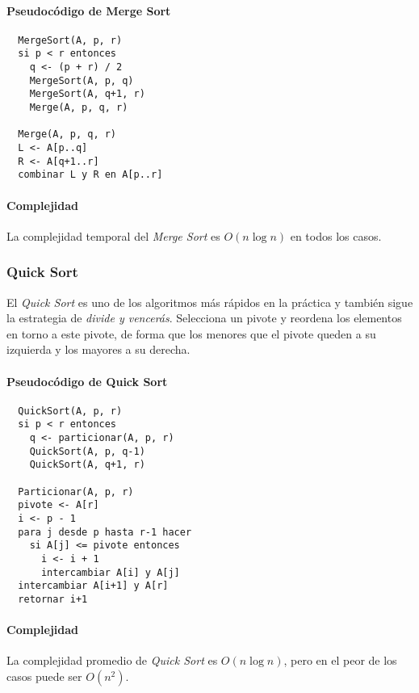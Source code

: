 \paragraph{Pseudocódigo de Merge Sort}

\begin{verbatim}
  MergeSort(A, p, r)
  si p < r entonces
    q <- (p + r) / 2
    MergeSort(A, p, q)
    MergeSort(A, q+1, r)
    Merge(A, p, q, r)
  
  Merge(A, p, q, r)
  L <- A[p..q]
  R <- A[q+1..r]
  combinar L y R en A[p..r]
\end{verbatim}

\paragraph{Complejidad}

La complejidad temporal del \textit{Merge Sort} es \( O(n \log n) \) en todos los casos.

\subsubsection{Quick Sort}

El \textit{Quick Sort} es uno de los algoritmos más rápidos en la práctica y también sigue la estrategia de \textit{divide y vencerás}. Selecciona un pivote y reordena los elementos en torno a este pivote, de forma que los menores que el pivote queden a su izquierda y los mayores a su derecha.

\paragraph{Pseudocódigo de Quick Sort}

\begin{verbatim}
  QuickSort(A, p, r)
  si p < r entonces
    q <- particionar(A, p, r)
    QuickSort(A, p, q-1)
    QuickSort(A, q+1, r)
  
  Particionar(A, p, r)
  pivote <- A[r]
  i <- p - 1
  para j desde p hasta r-1 hacer
    si A[j] <= pivote entonces
      i <- i + 1
      intercambiar A[i] y A[j]
  intercambiar A[i+1] y A[r]
  retornar i+1
\end{verbatim}

\paragraph{Complejidad}

La complejidad promedio de \textit{Quick Sort} es \( O(n \log n) \), pero en el peor de los casos puede ser \( O(n^2) \).

